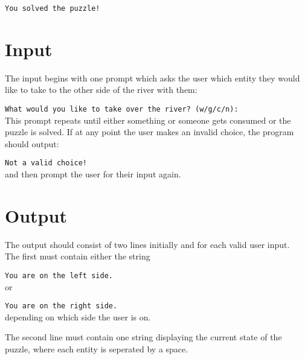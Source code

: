 \texttt{You solved the puzzle!}


\section*{Input}
The input begins with one prompt which asks the user
which entity they would like to take to the other side of the river with them:

\texttt{What would you like to take over the river? (w/g/c/n): }\\
This prompt repeats until either something or someone gets consumed or the puzzle is solved.
If at any point the user makes an invalid choice, the program should output:

\texttt{Not a valid choice!}\\
and then prompt the user for their input again.

\section*{Output}
The output should consist of two lines initially and for each valid user input.\\
The first must contain either the string

\texttt{You are on the left side.}\\
or

\texttt{You are on the right side.}\\
depending on which side the user is on.

The second line must contain one string displaying the current state of the puzzle,
where each entity is seperated by a space.



